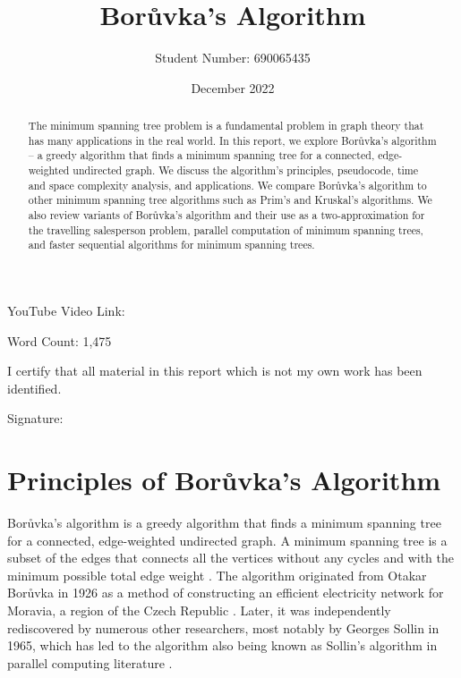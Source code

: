 \documentclass[a4paper, 11pt]{article}
\begin{document}
\title{Borůvka's Algorithm}
\author{Student Number: 690065435}
\date{December 2022}

\maketitle

\begin{abstract}
The minimum spanning tree problem is a fundamental problem in graph theory that has many applications in the real world. In this report, we explore Borůvka's algorithm -- a greedy algorithm that finds a minimum spanning tree for a connected, edge-weighted undirected graph. We discuss the algorithm's principles, pseudocode, time and space complexity analysis, and applications. We compare Borůvka's algorithm to other minimum spanning tree algorithms such as Prim's and Kruskal's algorithms. We also review variants of Borůvka's algorithm and their use as a two-approximation for the travelling salesperson problem, parallel computation of minimum spanning trees, and faster sequential algorithms for minimum spanning trees.

\begin{center}
\end{center}
\end{abstract}

\vspace*{\fill}
\begin{center}
YouTube Video Link:

\vspace{0.5em}
Word Count: 1,475

\vspace{1em}
I certify that all material in this report which is not my own work has been identified.
\end{center}
\vspace{1em}

Signature: \hrulefill

\newpage
\section{Principles of Borůvka's Algorithm}
Borůvka's algorithm is a greedy algorithm that finds a minimum spanning tree for a connected, edge-weighted undirected graph. A minimum spanning tree is a subset of the edges that connects all the vertices without any cycles and with the minimum possible total edge weight \cite{graham1985history}. The algorithm originated from Otakar Borůvka in 1926 as a method of constructing an efficient electricity network for Moravia, a region of the Czech Republic \cite{nevsetvril2001otakar}. Later, it was independently rediscovered by numerous other researchers, most notably by Georges Sollin in 1965, which has led to the algorithm also being known as Sollin's algorithm in parallel computing literature \cite{sollin1965trace}. 
\end{document}
